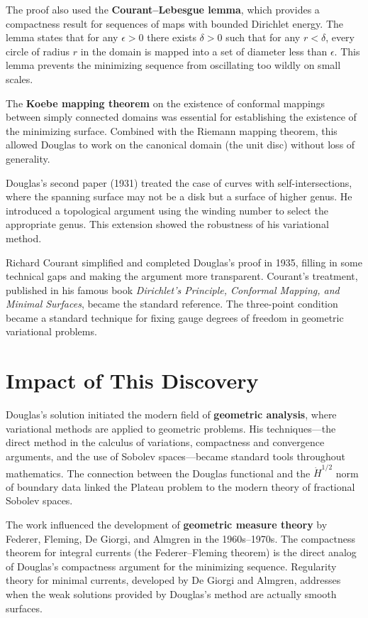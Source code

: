 The proof also used the \textbf{Courant--Lebesgue lemma}, which provides
a compactness result for sequences of maps with bounded Dirichlet
energy. The lemma states that for any $\epsilon > 0$ there exists
$\delta > 0$ such that for any $r < \delta$, every circle of radius $r$
in the domain is mapped into a set of diameter less than $\epsilon$.
This lemma prevents the minimizing sequence from oscillating too wildly
on small scales.

The \textbf{Koebe mapping theorem} on the existence of conformal
mappings between simply connected domains was essential for establishing
the existence of the minimizing surface. Combined with the Riemann
mapping theorem, this allowed Douglas to work on the canonical domain
(the unit disc) without loss of generality.

Douglas's second paper (1931) treated the case of curves with
self-intersections, where the spanning surface may not be a disk but a
surface of higher genus. He introduced a topological argument using the
winding number to select the appropriate genus. This extension showed
the robustness of his variational method.

Richard Courant simplified and completed Douglas's proof in 1935,
filling in some technical gaps and making the argument more transparent.
Courant's treatment, published in his famous book
\emph{Dirichlet's Principle, Conformal Mapping, and Minimal Surfaces},
became the standard reference. The three-point condition became a
standard technique for fixing gauge degrees of freedom in geometric
variational problems.

\section{Impact of This Discovery}

Douglas's solution initiated the modern field of \textbf{geometric
analysis}, where variational methods are applied to geometric problems.
His techniques---the direct method in the calculus of variations,
compactness and convergence arguments, and the use of Sobolev
spaces---became standard tools throughout mathematics. The connection
between the Douglas functional and the $\dot{H}^{1/2}$ norm of boundary
data linked the Plateau problem to the modern theory of fractional
Sobolev spaces.

The work influenced the development of \textbf{geometric measure theory}
by Federer, Fleming, De Giorgi, and Almgren in the 1960s--1970s. The
compactness theorem for integral currents (the Federer--Fleming theorem)
is the direct analog of Douglas's compactness argument for the
minimizing sequence. Regularity theory for minimal currents, developed
by De Giorgi and Almgren, addresses when the weak solutions provided by
Douglas's method are actually smooth surfaces.

